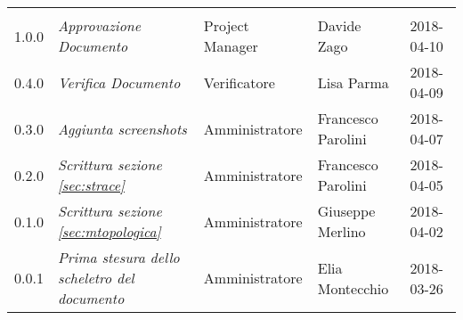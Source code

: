 \newpage 
\section*{}
\begin{table}[H]
	\centering
	\begin{tabular}{C{2cm}|C{4cm}|C{3cm}|C{3cm}|R{2cm}}
		
		 & & & & \\
		
		
		1.0.0  & \emph{Approvazione Documento} & Project Manager & Davide Zago &  2018-04-10 \\
		\hline
		
		0.4.0  & \emph{Verifica Documento} & Verificatore & Lisa Parma &  2018-04-09 \\
		\hline
		
		0.3.0 & \emph{Aggiunta screenshots} & Amministratore & Francesco Parolini &  2018-04-07 \\
		\hline
		
		0.2.0 & \emph{Scrittura sezione \ref{sec:strace}} & Amministratore & Francesco Parolini &  2018-04-05 \\
		\hline
		
		0.1.0 & \emph{Scrittura sezione \ref{sec:mtopologica}} & Amministratore & Giuseppe Merlino &  2018-04-02 \\
		\hline
		
		
		0.0.1 & \emph{Prima stesura dello scheletro del documento} & Amministratore & Elia Montecchio &  2018-03-26 \\
		
		
	\end{tabular}
	
\end{table}


\clearpage